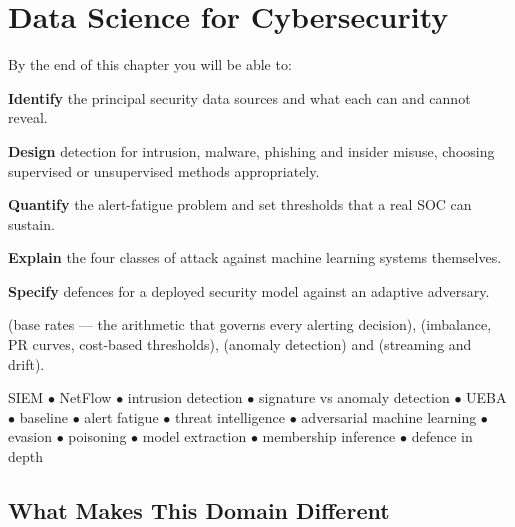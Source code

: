\chapter{Data Science for Cybersecurity}\label{ch:cybersecurity}

\begin{outcomes}
By the end of this chapter you will be able to:
\begin{tight}
  \item \textbf{Identify} the principal security data sources and what each can and cannot reveal.
  \item \textbf{Design} detection for intrusion, malware, phishing and insider misuse, choosing supervised or unsupervised methods appropriately.
  \item \textbf{Quantify} the alert-fatigue problem and set thresholds that a real SOC can sustain.
  \item \textbf{Explain} the four classes of attack against machine learning systems themselves.
  \item \textbf{Specify} defences for a deployed security model against an adaptive adversary.
\end{tight}
\end{outcomes}

\begin{prereq}
 (base rates --- the arithmetic that governs every alerting
decision),  (imbalance, PR curves, cost-based thresholds),
 (anomaly detection) and  (streaming and
drift).
\end{prereq}

\begin{keyterms}
SIEM $\bullet$ NetFlow $\bullet$ intrusion detection $\bullet$ signature vs anomaly
detection $\bullet$ UEBA $\bullet$ baseline $\bullet$ alert fatigue $\bullet$
threat intelligence $\bullet$ adversarial machine learning $\bullet$ evasion
$\bullet$ poisoning $\bullet$ model extraction $\bullet$ membership inference
$\bullet$ defence in depth
\end{keyterms}

\section{What Makes This Domain Different}

